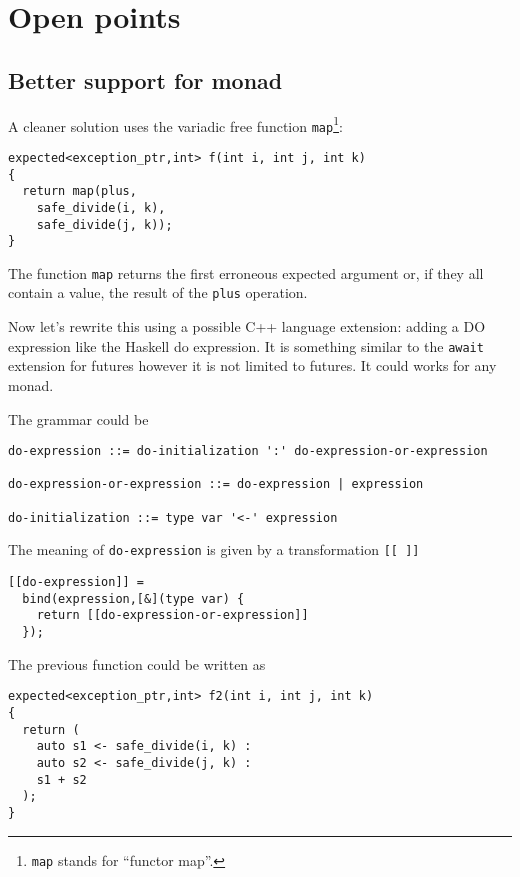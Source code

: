 \documentclass[a4paper,10pt]{article}
\newcommand{\cpp}[1]{\lstinline{#1}}
\begin{document}
\section{Open points}

\subsection{Better support for monad}
\label{better-support-for-monad}

A cleaner solution uses the variadic free function \cpp{map}\footnote{\cpp{map} stands for ``functor map''.}:

\begin{lstlisting}
expected<exception_ptr,int> f(int i, int j, int k)
{
  return map(plus,
    safe_divide(i, k), 
    safe_divide(j, k));
}
\end{lstlisting}

The function \cpp{map} returns the first erroneous expected argument or, if they all contain a value, the result of the \cpp{plus} operation.


Now let's rewrite this using a possible C++ language extension: adding a DO expression like the Haskell do expression. It is something similar  to the \cpp{await} extension for futures however it is not limited to futures. It could works for any monad.   

The grammar could be

\begin{lstlisting}
do-expression ::= do-initialization ':' do-expression-or-expression

do-expression-or-expression ::= do-expression | expression

do-initialization ::= type var '<-' expression
\end{lstlisting}

The meaning of \cpp{do-expression}  is given by a transformation \cpp{[[ ]]}

\begin{lstlisting}
[[do-expression]] =
  bind(expression,[&](type var) {
    return [[do-expression-or-expression]]
  });
\end{lstlisting}

The previous function could be written as

\begin{lstlisting}
expected<exception_ptr,int> f2(int i, int j, int k)
{
  return (
    auto s1 <- safe_divide(i, k) :
    auto s2 <- safe_divide(j, k) :
    s1 + s2
  );
}
\end{lstlisting}
\end{document}
